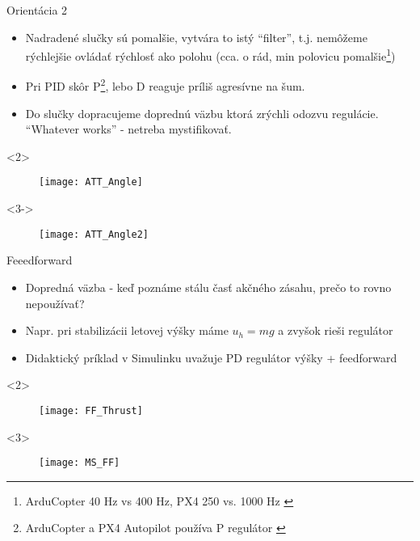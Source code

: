\begin{frame}[t]{Orientácia 2}
\begin{itemize}
  \item<1-> Nadradené slučky sú pomalšie, vytvára to istý ``filter'', t.j. nemôžeme rýchlejšie ovládať rýchlosť ako polohu (cca. o rád, min polovicu pomalšie\footnote{ArduCopter 40 Hz vs 400 Hz, PX4 250 vs. 1000 Hz \citep{AP:PID,PX4:PID}}) \citep{AP:PID,PX4:PID}
  \item<2-> Pri PID skôr P\footnote{ArduCopter a PX4 Autopilot používa P regulátor \citep{PX4:PID,AP:PIDDOC}}, lebo D reaguje príliš agresívne na šum.
  \item<3-> Do slučky dopracujeme doprednú väzbu  ktorá zrýchli odozvu regulácie. ``Whatever works'' - netreba mystifikovať.
  \end{itemize}



  \begin{onlyenv}<2>
  \begin{figure}
\centering
  \texttt{[image: ATT\_Angle]}\\
\end{figure}
\end{onlyenv}

  \begin{onlyenv}<3->
\begin{figure}
\centering
  \texttt{[image: ATT\_Angle2]}\\
 \end{figure}
\end{onlyenv}

  \end{frame}

\begin{frame}[t]{Feeedforward}
\begin{itemize}
  \item<1-> Dopredná väzba - keď poznáme stálu časť akčného zásahu, prečo to rovno nepoužívať? 
  \item<2-> Napr. pri stabilizácii letovej výšky máme $u_h=mg$ a zvyšok rieši regulátor
  \item<3-> Didaktický príklad v Simulinku uvažuje PD regulátor výšky + feedforward
  
  \end{itemize}



  \begin{onlyenv}<2>
  \begin{figure}
\centering
  \texttt{[image: FF\_Thrust]}\\
\end{figure}
\end{onlyenv}

  \begin{onlyenv}<3>
\begin{figure}
\centering
  \texttt{[image: MS\_FF]}\\
 \end{figure}
\end{onlyenv}

  \end{frame}
  


